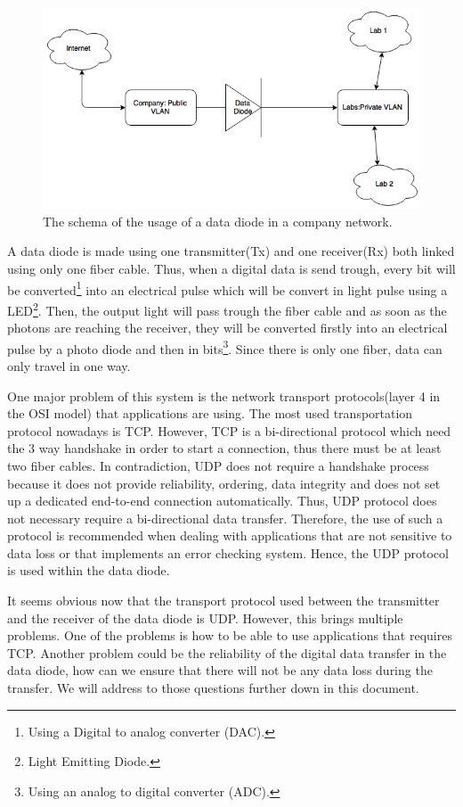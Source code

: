 \documentclass[a4paper,10pt]{article}
\begin{document}
\begin{figure}
\centering
\includegraphics[scale=0.45]{images/dataDiode.png}
\caption{The schema of the usage of a data diode in a company network.}
\label{fig:datadiode}
\end{figure}

A data diode is made using one transmitter(Tx) and one receiver(Rx) both linked using only one fiber cable. Thus, when a digital data is send trough, every bit will be converted\footnote{Using a Digital to analog converter (DAC).} into an electrical pulse which will be convert in light pulse using a LED\footnote{Light Emitting Diode.}. Then, the output light will pass trough the fiber cable and as soon as the photons are reaching the receiver, they will be converted firstly into an electrical pulse by a photo diode and then in bits\footnote{Using an analog to digital converter (ADC).}. Since there is only one fiber, data can only travel in one way.

One major problem of this system is the network transport protocols(layer 4 in the OSI model) that applications are using. The most used transportation protocol nowadays is TCP. However, TCP is a bi-directional protocol which need the 3 way handshake in order to start a connection, thus there must be at least two fiber cables. In contradiction, UDP does not require a handshake process because it does not provide reliability, ordering, data integrity and does not set up a dedicated end-to-end connection automatically. Thus, UDP protocol does not necessary require a bi-directional data transfer. Therefore, the use of such a protocol is recommended when dealing with applications that are not sensitive to data loss or that implements an error checking system. Hence, the UDP protocol is used within the data diode.

It seems obvious now that the transport protocol used between the transmitter and the receiver of the data diode is UDP. However, this brings multiple problems. One of the problems is how to be able to use applications that requires TCP. Another problem could be the reliability of the digital data transfer in the data diode, how can we ensure that there will not be any data loss during the transfer. We will address to those questions further down in this document.
\end{document}
